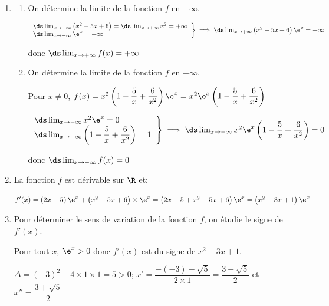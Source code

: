 \begin{enumerate}
\item 
	\begin{enumerate}
		\item On détermine la limite de la fonction $f$ en $+\infty$.
		
$\left .
\begin{array}{l}
\ds\lim_{x\to +\infty} \left (x^2-5x+6\right ) = \ds\lim_{x\to +\infty} x^2 = +\infty\\
\ds\lim_{x\to +\infty} \e^{x} = +\infty
\end{array}
\right \}		
\implies
\ds\lim_{x\to +\infty} \left (x^2-5x+6\right )\e^{x} = +\infty$

donc
$\ds\lim_{x\to +\infty} f(x)=+\infty$		
		
		\item On détermine la limite de la fonction $f$ en $-\infty$.
		
Pour $x\neq 0$, $f(x)=x^2\left (1-\dfrac{5}{x} +\dfrac{6}{x^2}\right )\e^{x}	
= x^2\e^{x}\left (1-\dfrac{5}{x} +\dfrac{6}{x^2}\right )$

$\left .
\begin{array}{l}
\ds\lim_{x\to -\infty} x^2 \e^{x} = 0\\
\ds\lim_{x\to -\infty} \left (1-\dfrac{5}{x} +\dfrac{6}{x^2}\right )=1
\end{array}
\right \}		
\implies
\ds\lim_{x\to -\infty} x^2\e^{x}\left (1-\dfrac{5}{x} +\dfrac{6}{x^2}\right ) = 0$

donc
$\ds\lim_{x\to -\infty} f(x)=0$
		
	\end{enumerate}
\item 
La fonction $f$ est dérivable sur $\R$ et:

$f'(x)=\left (2x-5\right )\e^{x} + \left (x^2-5x+6\right )\times \e^{x}
= \left ( 2x-5+x^2-5x+6\right )\e^{x}
= \left (x^2-3x+1\right )\e^{x}$


\item Pour déterminer le sens de variation de la fonction $f$, on étudie le signe de $f'(x)$.

Pour tout $x$, $\e^{x}>0$ donc $f'(x)$ est du signe de $x^2-3x+1$.

$\Delta=(-3)^2-4\times 1 \times 1 = 5>0$;
$x'=\dfrac{-(-3)-\sqrt{5}}{2\times 1} = \dfrac{3-\sqrt{5}}{2}$
et $x''=\dfrac{3+\sqrt{5}}{2}$


\end{enumerate}
